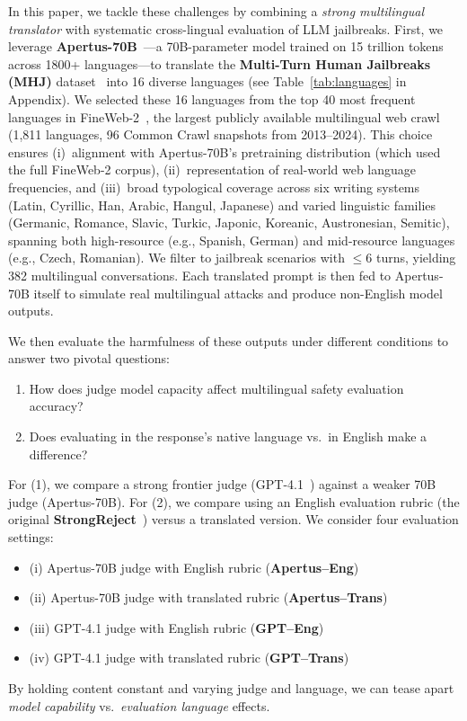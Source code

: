 In this paper, we tackle these challenges by combining a \textit{strong multilingual translator} with systematic cross-lingual evaluation of LLM jailbreaks. First, we leverage \textbf{Apertus-70B}~\cite{hernandez2025apertus}---a 70B-parameter model trained on 15 trillion tokens across 1800+ languages---to translate the \textbf{Multi-Turn Human Jailbreaks (MHJ)} dataset~\cite{li2024mhj} into 16 diverse languages (see Table~\ref{tab:languages} in Appendix). We selected these 16 languages from the top 40 most frequent languages in FineWeb-2~\citep{penedo2025fineweb2}, the largest publicly available multilingual web crawl (1,811 languages, 96 Common Crawl snapshots from 2013--2024). This choice ensures (i)~alignment with Apertus-70B's pretraining distribution (which used the full FineWeb-2 corpus), (ii)~representation of real-world web language frequencies, and (iii)~broad typological coverage across six writing systems (Latin, Cyrillic, Han, Arabic, Hangul, Japanese) and varied linguistic families (Germanic, Romance, Slavic, Turkic, Japonic, Koreanic, Austronesian, Semitic), spanning both high-resource (e.g., Spanish, German) and mid-resource languages (e.g., Czech, Romanian). We filter to jailbreak scenarios with $\leq 6$ turns, yielding 382 multilingual conversations. Each translated prompt is then fed to Apertus-70B itself to simulate real multilingual attacks and produce non-English model outputs.

We then evaluate the harmfulness of these outputs under different conditions to answer two pivotal questions:
\begin{enumerate}
    \item How does judge model capacity affect multilingual safety evaluation accuracy?
    \item Does evaluating in the response's native language vs.\ in English make a difference?
\end{enumerate}
For (1), we compare a strong frontier judge (GPT-4.1~\cite{openai2025gpt41}) against a weaker 70B judge (Apertus-70B). For (2), we compare using an English evaluation rubric (the original \textbf{StrongReject}~\cite{souly2024strongreject}) versus a translated version. We consider four evaluation settings:
\begin{itemize}
    \item (i) Apertus-70B judge with English rubric (\textbf{Apertus--Eng})
    \item (ii) Apertus-70B judge with translated rubric (\textbf{Apertus--Trans})
    \item (iii) GPT-4.1 judge with English rubric (\textbf{GPT--Eng})
    \item (iv) GPT-4.1 judge with translated rubric (\textbf{GPT--Trans})
\end{itemize}
By holding content constant and varying judge and language, we can tease apart \textit{model capability} vs.\ \textit{evaluation language} effects.

